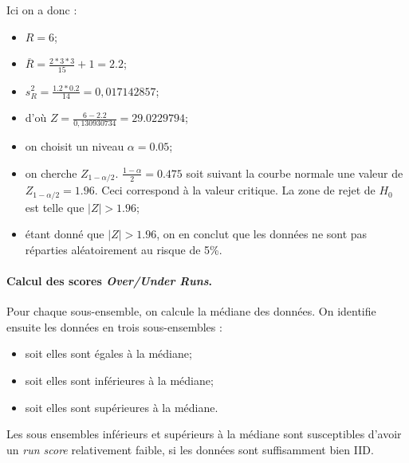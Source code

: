 Ici on a donc : 
\begin{itemize}
\item $R = 6$;
\item $\overline{R}= \frac{2*3*3}{15}+1 = 2.2 $;
\item $s_R^2 = \frac{1.2*0.2}{14} = 0,017142857$;
\item d'où $ Z = \frac{6 -2.2}{0,130930734} = 29.0229794$;
\item on choisit un niveau $\alpha=0.05$;
\item on cherche $Z_{1-\alpha/2}$. $\frac{1-\alpha}{2}=0.475$ soit suivant la courbe normale une valeur de $Z_{1-\alpha/2}=1.96$. Ceci correspond à la valeur critique. La zone de rejet de $H_0$ est telle que $|Z| > 1.96$;
\item étant donné que $|Z| > 1.96$, on en conclut que les données ne sont pas réparties aléatoirement au risque de 5\%.\\

\end{itemize}


\paragraph{Calcul des scores \textit{Over/Under Runs}.\\}
Pour chaque sous-ensemble, on calcule la médiane des données. On identifie ensuite les données en trois sous-ensembles :
\begin{itemize}
\item soit elles sont égales à la médiane;
\item soit elles sont inférieures à la médiane;
\item soit elles sont supérieures à la médiane.\\
\end{itemize}
Les sous ensembles inférieurs et supérieurs à la médiane sont susceptibles d'avoir un \textit{run score} relativement faible, si les données sont suffisamment bien IID.\\

